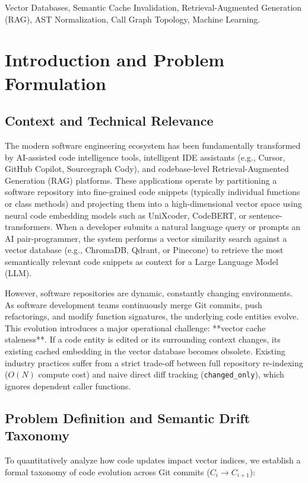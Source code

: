 \documentclass[conference]{IEEEtran}
\begin{document}
\begin{IEEEkeywords}
Vector Databases, Semantic Cache Invalidation, Retrieval-Augmented Generation (RAG), AST Normalization, Call Graph Topology, Machine Learning.
\end{IEEEkeywords}

\section{Introduction and Problem Formulation}

\subsection{Context and Technical Relevance}
The modern software engineering ecosystem has been fundamentally transformed by AI-assisted code intelligence tools, intelligent IDE assistants (e.g., Cursor, GitHub Copilot, Sourcegraph Cody), and codebase-level Retrieval-Augmented Generation (RAG) platforms. These applications operate by partitioning a software repository into fine-grained code snippets (typically individual functions or class methods) and projecting them into a high-dimensional vector space using neural code embedding models such as UniXcoder, CodeBERT, or sentence-transformers. When a developer submits a natural language query or prompts an AI pair-programmer, the system performs a vector similarity search against a vector database (e.g., ChromaDB, Qdrant, or Pinecone) to retrieve the most semantically relevant code snippets as context for a Large Language Model (LLM).

However, software repositories are dynamic, constantly changing environments. As software development teams continuously merge Git commits, push refactorings, and modify function signatures, the underlying code entities evolve. This evolution introduces a major operational challenge: **vector cache staleness**. If a code entity is edited or its surrounding context changes, its existing cached embedding in the vector database becomes obsolete. Existing industry practices suffer from a strict trade-off between full repository re-indexing ($O(N)$ compute cost) and naive direct diff tracking (\texttt{changed\_only}), which ignores dependent caller functions.

\subsection{Problem Definition and Semantic Drift Taxonomy}
To quantitatively analyze how code updates impact vector indices, we establish a formal taxonomy of code evolution across Git commits ($C_i \to C_{i+1}$):
\end{document}
